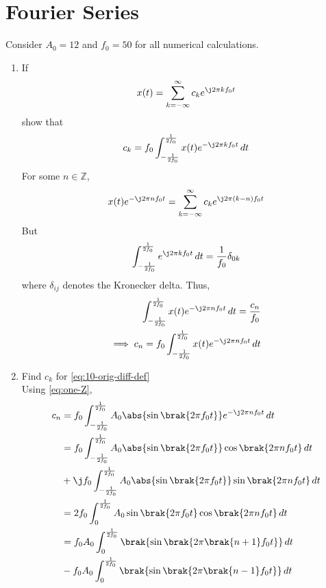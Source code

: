 \documentclass[journal,12pt,twocolumn]{IEEEtran}
\renewcommand\thesection{\arabic{section}}
\begin{document}
\section{Fourier Series}
Consider $A_0 =12$ and $f_0 = 50$ for all numerical calculations.
\begin{enumerate}[label=\thesection.\arabic*,ref=\thesection.\theenumi]
\item If
\begin{align}
	x(t) = \sum_{k = -\infty}^{\infty}c_ke^{\j2\pi kf_0 t}
	\label{eq:one-Z-complex}
\end{align}
show that 
\begin{align}
	c_k = f_0\int_{-\frac{1}{2f_0}}^{\frac{1}{2f_0}}x(t)e^{-\j2\pi kf_0 t}\, dt
	\label{eq:one-Z}
\end{align}
\solution For some $n \in \mathbb{Z}$,
\begin{align}
	x(t)e^{-\j2\pi nf_0t} = \sum_{k = -\infty}^{\infty}c_ke^{\j2\pi (k - n)f_0 t}
\end{align}
But
\begin{align}
	\int_{-\frac{1}{2f_0}}^{\frac{1}{2f_0}}e^{\j2\pi kf_0 t}\, dt = 
	\frac{1}{f_0}\delta_{0k}
\end{align}
where $\delta_{ij}$ denotes the Kronecker delta. Thus,
\begin{align}
	\int_{-\frac{1}{2f_0}}^{\frac{1}{2f_0}}x(t)e^{-\j2\pi nf_0 t}\, dt = 
	\frac{c_n}{f_0} \\
	\implies c_n = f_0\int_{-\frac{1}{2f_0}}^{\frac{1}{2f_0}}x(t)e^{-\j2\pi nf_0 t}\, dt 
\end{align}
\item Find $c_k$ for 
\eqref{eq:10-orig-diff-def} \\
\solution
Using \eqref{eq:one-Z},
\begin{align}
	c_n &= f_0\int_{-\frac{1}{2f_0}}^{\frac{1}{2f_0}}A_0\abs{\sin\brak{2\pi f_0t}}
	e^{-\j2\pi nf_0t}\, dt \\
	&= f_0\int_{-\frac{1}{2f_0}}^{\frac{1}{2f_0}}A_0\abs{\sin\brak{2\pi f_0t}}
	\cos\brak{2\pi nf_0t}\, dt \nonumber \\
	&+ \j f_0\int_{-\frac{1}{2f_0}}^{\frac{1}{2f_0}}A_0
	\abs{\sin\brak{2\pi f_0t}}\sin\brak{2\pi nf_0t}\, dt \\
	&= 2f_0\int_{0}^{\frac{1}{2f_0}}A_0\sin\brak{2\pi f_0t}\cos\brak{2\pi nf_0t}\, dt \\
	&= f_0A_0\int_{0}^{\frac{1}{2f_0}}\brak{\sin\brak{2\pi\brak{n+1}f_0t}}\, dt \nonumber \\ 
	&- f_0A_0\int_{0}^{\frac{1}{2f_0}}\brak{\sin\brak{2\pi\brak{n-1}f_0t}}\, dt \\ 

\end{align}
\end{enumerate}
\end{document}
